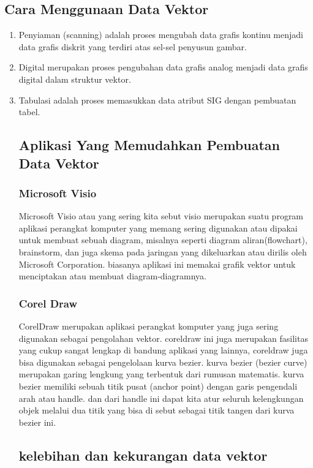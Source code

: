 \subsection { Cara Menggunaan Data Vektor}
\begin{enumerate}
Adapun cara menggunakan data vektor ke dalam SIG dapat dilakukan melalui tiga cara yaitu 
\item Penyiaman (scanning) adalah proses mengubah data grafis kontinu menjadi data grafis diskrit yang terdiri atas sel-sel penyusun gambar.
\item Digital merupakan proses pengubahan data grafis analog menjadi data grafis digital dalam struktur vektor.
\item Tabulasi adalah proses memasukkan data atribut SIG dengan pembuatan tabel.


\subsection {Aplikasi Yang Memudahkan Pembuatan Data Vektor}
\subsubsection {Microsoft Visio}
Microsoft Visio atau yang sering kita sebut visio merupakan suatu program aplikasi perangkat komputer yang memang sering digunakan atau dipakai untuk membuat sebuah diagram, misalnya seperti diagram aliran(flowchart), brainstorm, dan juga skema pada jaringan yang dikeluarkan atau dirilis oleh Microsoft Corporation. biasanya aplikasi ini memakai grafik vektor untuk menciptakan atau membuat diagram-diagramnya. 

\subsubsection {Corel Draw}
CorelDraw merupakan aplikasi perangkat komputer yang juga sering digunakan sebagai pengolahan vektor. coreldraw ini juga merupakan fasilitas yang cukup sangat lengkap di bandung aplikasi yang lainnya, coreldraw juga bisa digunakan sebagai pengelolaan kurva bezier. kurva bezier (bezier curve) merupakan garing lengkung yang terbentuk dari rumusan matematis. 
kurva bezier memiliki sebuah titik pusat (anchor point) dengan garis pengendali arah atau handle. dan dari handle ini dapat kita atur seluruh kelengkungan objek melalui dua titik yang bisa di sebut sebagai titik tangen dari kurva bezier ini.


\subsection{kelebihan dan kekurangan data vektor}

\end{enumerate}
